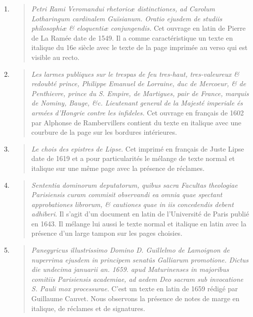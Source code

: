 \documentclass[a4paper,12pt,twoside]{book}
\begin{document}
	\begin{enumerate}
	\item
	\begin{quote}
	\emph{Petri Rami Veromandui rhetoricæ distinctiones, ad Carolum Lotharingum cardinalem Guïsianum. Oratio ejusdem de studiis philosophiæ \& eloquentiæ conjungendis.} 
	Cet ouvrage en latin de Pierre de La Ramée date de 1549. Il a comme caractéristique un texte en italique du 16e siècle avec le texte de la page imprimée au verso qui est visible au recto. 
	
	\end{quote}	
	\item
	\begin{quote}
	
	\emph{Les larmes publiques sur le trespas de feu tres-haut, tres-valeureux \& redoubté prince, Philippe Emanuel de Lorraine, duc de Mercoeur, \& de Penthievre, prince du S. Empire, de Martigues, pair de France, marquis de Nominy, Bauge, \&c. Lieutenant general de la Majesté imperiale és armées d'Hongrie contre les infideles.}
	Cet ouvrage en français de 1602	par Alphonse de Rambervillers contient du texte en italique avec une courbure de la page sur les bordures intérieures.
	
\end{quote}	
\item
\begin{quote}
	
	\emph{Le chois des epistres de Lipse.}
	Cet imprimé en français de Juste Lipse date de 1619	et a pour particularités le mélange de texte normal et italique sur une même page avec la présence de réclames.
	
\end{quote}	
\item
\begin{quote}
	
	\emph{Sententia dominorum deputatorum, quibus sacra Facultas theologiae Parisiensis curam commisit observandi ea omnia quae spectant approbationes librorum, \& cautiones quae in iis concedendis debent adhiberi}.
	Il s'agit d'un document en latin de l'Université de Paris publié en 1643. Il mélange lui aussi le texte normal et italique en latin avec la présence d'un large tampon sur les pages choisies. 
	
\end{quote}	
\item
\begin{quote}
	
	\emph{Panegyricus illustrissimo Domino D. Guillelmo de Lamoignon de nuperrima ejusdem in principem senatûs Galliarum promotione. Dictus die undecima januarii an. 1659. apud Maturinenses in majoribus comitiis Parisiensis academiae, ad aedem Deo sacram sub invocatione S. Pauli mox processurae.}
	C'est un texte en latin de 1659	rédigé par Guillaume Cauvet. Nous observons la présence de notes de marge en italique, de réclames et de signatures. 
	

\end{quote}
\end{enumerate}
\end{document}
